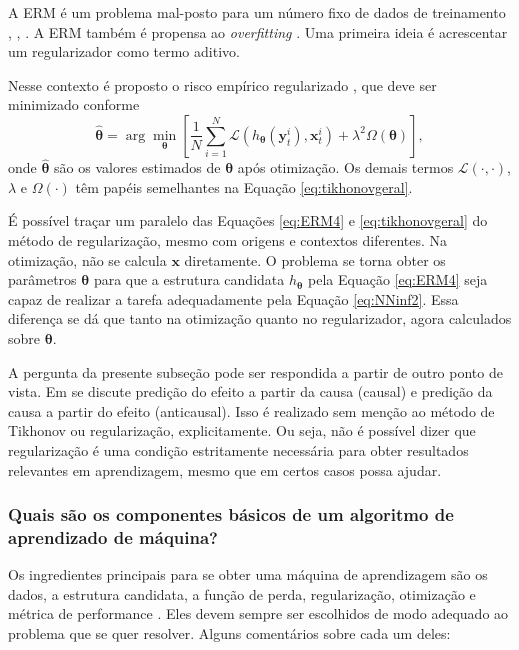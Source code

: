 A ERM é um problema mal-posto para um número fixo de dados de treinamento \cite[pág. 85]{Arridge2019}, \cite[pág. 25]{cherkassky2007learning}, \cite{Mukherjee2006}. A ERM também é propensa ao \textit{overfitting} \cite[pág. 276]{goodfellow2016deep}. Uma primeira ideia é acrescentar um regularizador como termo aditivo. 

Nesse contexto é proposto o risco empírico regularizado \cite[Equação 23]{Adler2021}, que deve ser minimizado conforme 
\begin{equation}
\hat{\bm{\theta}} = \arg\min\limits_{\bm{\theta}} \left[ \frac{1}{N} \sum_{i=1}^{N} \mathcal{L} \left(h_{\bm{\theta}}(\mathbf{y}_t^{i}), \mathbf{x}_t^{i} \right) + \lambda^2 \Omega(\bm{\theta}) \right], 
\label{eq:ERM4}
\end{equation}
onde $\hat{\bm{\theta}}$ são os valores estimados de $\bm{\theta}$ após otimização. Os demais termos $\mathcal{L} \left( \cdot, \cdot \right)$, $\lambda$ e  $\Omega(\cdot)$ têm papéis semelhantes na Equação \eqref{eq:tikhonovgeral}. 

É possível traçar um paralelo das Equações \eqref{eq:ERM4} e \eqref{eq:tikhonovgeral} do método de regularização, mesmo com origens e contextos diferentes. Na otimização, não se calcula $\mathbf{x}$ diretamente. O problema se torna obter os parâmetros $\bm{\theta}$ para que a estrutura candidata $h_{\bm{\theta}}$ pela Equação \eqref{eq:ERM4} seja capaz de realizar a tarefa adequadamente pela Equação \eqref{eq:NNinf2}. Essa diferença se dá que tanto na otimização quanto no regularizador, agora calculados sobre $\bm{\theta}$. 

A pergunta da presente subseção pode ser respondida a partir de outro ponto de vista. Em \cite{Scholkopf2012} se discute predição do efeito a partir da causa (causal) e predição da causa a partir do efeito (anticausal). Isso é realizado sem menção ao método de Tikhonov ou regularização, explicitamente. Ou seja, não é possível dizer que regularização é uma condição estritamente necessária para obter resultados relevantes em aprendizagem, mesmo que em certos casos possa ajudar. 
  
\subsubsection{Quais são os componentes básicos de um algoritmo de aprendizado de máquina?}\label{sec:general3}

Os ingredientes principais para se obter uma máquina de aprendizagem são os dados, a estrutura candidata, a função de perda, regularização, otimização e métrica de performance \cite{goodfellow2016deep}. Eles devem sempre ser escolhidos de modo adequado ao problema que se quer resolver. Alguns comentários sobre cada um deles:

